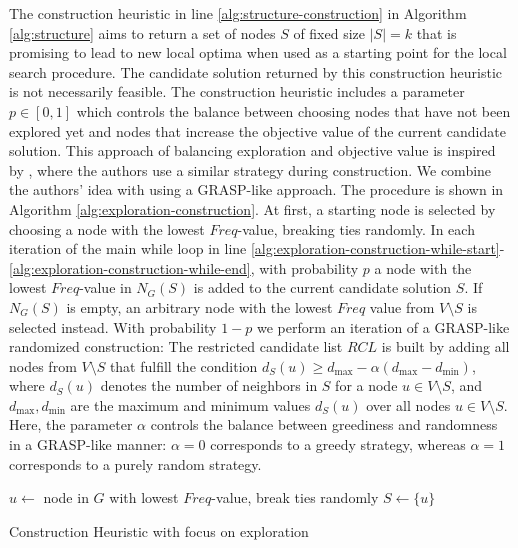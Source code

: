 \documentclass[draft,final]{vutinfth} %
\begin{document}
The construction heuristic in line \ref{alg:structure-construction} in Algorithm \ref{alg:structure} aims to return a set of nodes $S$ of fixed size $|S| = k$ that is promising to lead to new local optima when used as a starting point for the local search procedure. The candidate solution returned by this construction heuristic is not necessarily feasible. 
The construction heuristic includes a parameter $p \in [0,1]$ which controls the balance between choosing nodes that have not been explored yet and nodes that increase the objective value of the current candidate solution. This approach of balancing exploration and objective value is inspired by \cite{chen_nuqclq_2021}, where the authors use a similar strategy during construction. We combine the authors' idea with using a GRASP-like approach. The procedure is shown in Algorithm \ref{alg:exploration-construction}. 
At first, a starting node is selected by choosing a node with the lowest $Freq$-value, breaking ties randomly. In each iteration of the main while loop in line \ref{alg:exploration-construction-while-start}-\ref{alg:exploration-construction-while-end}, with probability $p$ a node with the lowest $Freq$-value in $N_G(S)$ is added to the current candidate solution $S$. If $N_G(S)$ is empty, an arbitrary node with the lowest $Freq$ value from $V\setminus S$ is selected instead. 
With probability $1-p$ we perform an iteration of a GRASP-like randomized construction: The restricted candidate list $\mathit{RCL}$ is built by adding all nodes from $V \setminus S$ that fulfill the condition $d_S(u) \geq d_{\max} - \alpha(d_{\max} - d_{\min})$, where $d_S(u)$ denotes the number of neighbors in $S$ for a node $u \in V \setminus S$, and $d_{\max}, d_{\min}$ are the maximum and minimum values $d_S(u)$ over all nodes $u\in V \setminus S$. Here, the parameter $\alpha$ controls the balance between greediness and randomness in a GRASP-like manner: $\alpha=0$ corresponds to a greedy strategy, whereas $\alpha=1$ corresponds to a purely random strategy.  

\begin{algorithm}
    \DontPrintSemicolon
    $u \gets $ node in $G$ with lowest $Freq$-value, break ties randomly \;
    $S \gets \{u\}$ \;
    \label{alg:exploration-construction-while-end}
    \caption{Construction Heuristic with focus on exploration}
    \label{alg:exploration-construction}
\end{algorithm}
\end{document}

